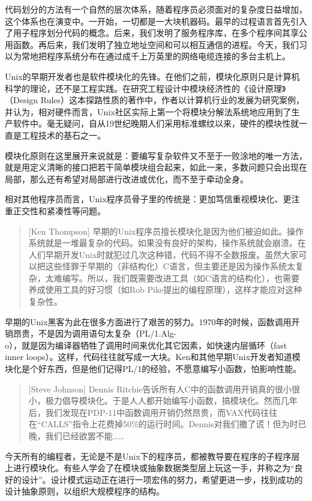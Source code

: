 \documentclass[12pt,oneside]{book}
\begin{document}
代码划分的方法有一个自然的层次体系，随着程序员必须面对的复杂度日益增加，这个体系也在演变中。一开始，一切都是一大块机器码。最早的过程语言首先引入了用子程序划分代码的概念。后来，我们发明了服务程序库，在多个程序间其享公用函数。再后来，我们发明了独立地址空间和可以相互通信的进程。今天，我们习以为常地把程序系统分布在通过成千上万英里的网络电缆连接的多台主机上。

Unix的早期开发者也是软件模块化的先锋。在他们之前，模块化原则只是计算机科学的理论，还不是工程实践。在研究工程设计中模块经济性的《设计原理》（Design Rules）\cite{Baldwin-Clark}这本探路性质的著作中，作者以计算机行业的发展为研究案例，并认为，相对硬件而言，Unix社区实际上第一个将模块分解法系统地应用到了生产软件中。毫无疑问，自从19世纪晚期人们采用标准螺纹以来，硬件的模块性就一直是工程技术的基石之一。

模块化原则在这里展开来说就是：要编写复杂软件又不至于一败涂地的唯一方法，就是用定义清晰的接口把若干简单模块组合起来，如此一来，多数问题只会出现在局部，那么还有希望对局部进行改进或优化，而不至于牵动全身。

相对其他程序员而言，Unix程序员骨子里的传统是：更加笃信重视模块化、更注重正交性和紧凑性等问题。
\begin{quote}[Ken Thompson]
早期的Unix程序员擅长模块化是因为他们被迫如此。操作系统就是一堆最复杂的代码。如果没有良好的架构，操作系统就会崩溃。在人们早期开发Unix时就犯过几次这种错，代码不得不全数报废。虽然大家可以把这些怪罪于早期的（非结构化）C语言，但主要还是因为操作系统太复杂，太难编写。所以，我们既需要改进工具（如C语言的结构化），也需要养成使用工具的好习惯（如Rob Pike提出的编程原理），这样才能应对这种复杂性。
\end{quote}

早期的Unix黑客为此在很多方面进行了艰苦的努力。1970年的时候，函数调用开销昂贵，不是因为调用语句太复杂（PL/1.Alg-\\o），就是因为编译器牺牲了调用时间来优化其它因素，如快速内层循环（fast inner loops）。这样，代码往往就写成一大块。Ken和其他早期Unix开发者知道模块化是个好东西，但是他们记得PL/1的经验，不愿意编写小函数，怕影响性能。
\begin{quote}[Steve Johnson]
Dennis Ritchie告诉所有人C中的函数调用开销真的很小很小，极力倡导模块化。于是人人都开始编写小函数，搞模块化。然而几年后，我们发现在PDP-11中函数调用开销仍然昂贵，而VAX代码往往在“CALLS”指令上花费掉50\%的运行时间。Dennis对我们撒了谎！但为时已晚，我们已经欲罢不能……
\end{quote}

今天所有的编程者，无论是不是Unix下的程序员，都被教导要在程序的子程序层上进行模块化。有些人学会了在模块或抽象数据类型层上玩这一手，并称之为“良好的设计”。设计模式运动正在进行一项宏伟的努力，希望更进一步，找到成功的设计抽象原则，以组织大规模程序的结构。
\end{document}
